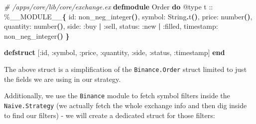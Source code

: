 \documentclass[
  oneside]{book}
\newenvironment{Shaded}{\begin{snugshade}}{\end{snugshade}}
\newcommand{\CommentTok}[1]{\textcolor[rgb]{0.56,0.35,0.01}{\textit{#1}}}
\newcommand{\ConstantTok}[1]{\textcolor[rgb]{0.56,0.35,0.01}{#1}}
\newcommand{\FunctionTok}[1]{\textcolor[rgb]{0.13,0.29,0.53}{\textbf{#1}}}
\newcommand{\KeywordTok}[1]{\textcolor[rgb]{0.13,0.29,0.53}{\textbf{#1}}}
\newcommand{\NormalTok}[1]{#1}
\newcommand{\OperatorTok}[1]{\textcolor[rgb]{0.81,0.36,0.00}{\textbf{#1}}}
\newcommand{\OtherTok}[1]{\textcolor[rgb]{0.56,0.35,0.01}{#1}}
\newcommand{\VariableTok}[1]{\textcolor[rgb]{0.00,0.00,0.00}{#1}}
\begin{document}
\begin{Shaded}
\begin{Highlighting}[]
  \CommentTok{\# /apps/core/lib/core/exchange.ex}
  \KeywordTok{defmodule} \ConstantTok{Order} \KeywordTok{do}
    \OtherTok{@type}\NormalTok{ t :: \%}\ConstantTok{\_\_MODULE\_\_}\FunctionTok{\{}
            \VariableTok{id:}\NormalTok{ non\_neg\_integer}\FunctionTok{()}\NormalTok{,}
            \VariableTok{symbol:} \ConstantTok{String}\OperatorTok{.}\NormalTok{t}\FunctionTok{()}\NormalTok{,}
            \VariableTok{price:}\NormalTok{ number}\FunctionTok{()}\NormalTok{,}
            \VariableTok{quantity:}\NormalTok{ number}\FunctionTok{()}\NormalTok{,}
            \VariableTok{side:} \VariableTok{:buy} \OperatorTok{|} \VariableTok{:sell}\NormalTok{,}
            \VariableTok{status:} \VariableTok{:new} \OperatorTok{|} \VariableTok{:filled}\NormalTok{,}
            \VariableTok{timestamp:}\NormalTok{ non\_neg\_integer}\FunctionTok{()}
          \FunctionTok{\}}

    \KeywordTok{defstruct} \OtherTok{[}\VariableTok{:id}\NormalTok{, }\VariableTok{:symbol}\NormalTok{, }\VariableTok{:price}\NormalTok{, }\VariableTok{:quantity}\NormalTok{, }\VariableTok{:side}\NormalTok{, }\VariableTok{:status}\NormalTok{, }\VariableTok{:timestamp}\OtherTok{]}
  \KeywordTok{end}
\end{Highlighting}
\end{Shaded}

The above struct is a simplification of the \texttt{Binance.Order} struct limited to just the fields we are using in our strategy.

Additionally, we use the \texttt{Binance} module to fetch symbol filters inside the \texttt{Naive.Strategy} (we actually fetch the whole exchange info and then dig inside to find our filters) - we will create a dedicated struct for those filters:
\end{document}

